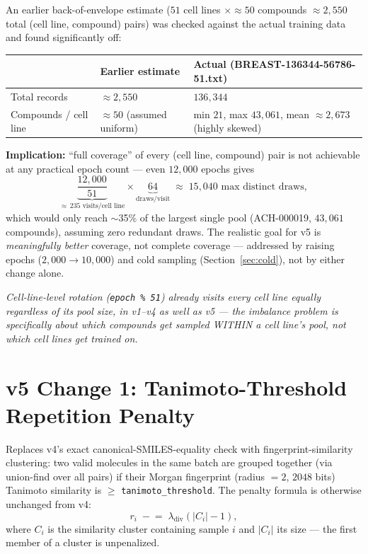 \documentclass[11pt]{article}
\newcommand{\note}[1]{{\itshape\color{notegray}#1\par}}
\newcommand{\code}[1]{\texttt{#1}}
\begin{document}
An earlier back-of-envelope estimate ($51$ cell lines $\times \approx 50$ compounds $\approx 2{,}550$ total (cell line, compound) pairs) was checked against the actual training data and found significantly off:

\begin{center}
\begin{tabular}{@{}l l l@{}}
\toprule
 & \textbf{Earlier estimate} & \textbf{Actual (BREAST-136344-56786-51.txt)} \\
\midrule
Total records & $\approx 2{,}550$ & $136{,}344$ \\
Compounds / cell line & $\approx 50$ (assumed uniform) & min $21$, max $43{,}061$, mean $\approx 2{,}673$ (highly skewed) \\
\bottomrule
\end{tabular}
\end{center}

\textbf{Implication:} ``full coverage'' of every (cell line, compound) pair is not achievable at any practical epoch count --- even $12{,}000$ epochs gives
\[
  \underbrace{\frac{12{,}000}{51}}_{\approx\,235\text{ visits/cell line}} \times \underbrace{64}_{\text{draws/visit}} \;\approx\; 15{,}040 \text{ max distinct draws},
\]
which would only reach $\sim$35\% of the largest single pool (ACH-000019, $43{,}061$ compounds), assuming zero redundant draws. The realistic goal for v5 is \emph{meaningfully better} coverage, not complete coverage --- addressed by raising epochs ($2{,}000 \to 10{,}000$) and cold sampling (Section~\ref{sec:cold}), not by either change alone.

\note{Cell-line-level rotation (\code{epoch \% 51}) already visits every cell line equally regardless of its pool size, in v1--v4 as well as v5 --- the imbalance problem is specifically about which compounds get sampled WITHIN a cell line's pool, not which cell lines get trained on.}

\section{v5 Change 1: Tanimoto-Threshold Repetition Penalty}
\label{sec:tanimoto}

Replaces v4's exact canonical-SMILES-equality check with fingerprint-similarity clustering: two valid molecules in the same batch are grouped together (via union-find over all pairs) if their Morgan fingerprint (radius $=2$, $2048$ bits) Tanimoto similarity is $\geq$ \code{tanimoto\_threshold}. The penalty formula is otherwise unchanged from v4:
\[
  r_i \;\mathrel{-}=\; \lambda_{\text{div}} \left( |C_i| - 1 \right),
\]
where $C_i$ is the similarity cluster containing sample $i$ and $|C_i|$ its size --- the first member of a cluster is unpenalized.
\end{document}
